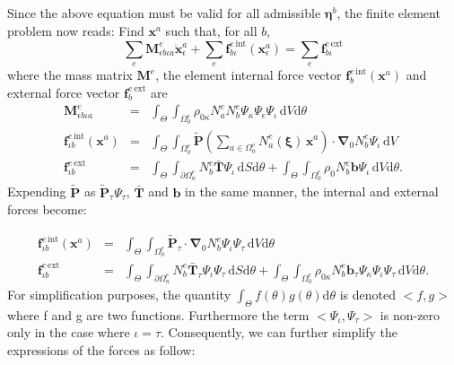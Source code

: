 \documentclass[oneside,11pt,times]{book}
\begin{document}
Since the above equation must be valid for all admissible $\bm{\eta}^b$, the finite element problem now reads: Find $\bm{x}^a$ such that, for all $b$,
%
\begin{equation} \label{equationGlobalWeakForm1}
 \sum_e \bm{M}^{e}_{\epsilon b \iota a} \ddot{\bm{x}}^a_{\epsilon} +
 \sum_e \bm{f}_{b\iota}^{e\,\text{int}}(\bm{x}^a_{\epsilon}) = \sum_e \bm{f}_{b\iota}^{e\,\text{ext}}
\end{equation}
%
where the mass matrix $\bm{M}^{e}$, the element internal force vector $\bm{f}_{b}^{e\,\text{int}}(\bm{x}^a)$ and external force vector $\bm{f}_{b}^{e\,\text{ext}}$ are
%
%
\begin{eqnarray}
 \bm{M}^{e}_{\epsilon b \iota a} & = & \int_{\Theta} \int_{\Omega_{0}^{e}} \rho_{0\kappa} N_a^e N_b^e \Psi_{\kappa}\Psi_{\epsilon}\Psi_{\iota}\, \text{d} V \text{d} \theta    \label{equationElementMassMatrix} \\
 \bm{f}_{\iota b}^{e\,\text{int}}(\bm{x}^a) & = & \int_{\Theta} \int_{\Omega_{0}^e} \tilde{\bm{P}}\left( \sum_{a \in \Omega_{0}^e} N^e_a(\bm{\xi})\, \bm{x}^a \right) \cdot \bm{\nabla}\!_0 N_b^e \Psi_{\iota} \,  \text{d} V \label{equationInternalForceVector} \\
 \bm{f}_{\iota b}^{e\,\text{ext}} & = & \int_{\Theta} \int_{\partial \Omega_{n}^e} N_b^e \bar{\bm{T}} \Psi_{\iota}\, \text{d} S \text{d} \theta +
 \int_{\Theta} \int_{\Omega_{0}^e} \rho_0 N_b^e \bm{b} \Psi_{\iota} \, \text{d} V \text{d} \theta \label{equationExternalForceVector}.
\end{eqnarray}
%
Expending $\tilde{\bm{P}}$ as $\tilde{\bm{P}}_{\tau}\Psi_{\tau}$, $\bar{\bm{T}}$ and $\bm{b}$ in the same manner, the internal and external forces become:

\begin{eqnarray}
 \bm{f}_{\iota b}^{e\,\text{int}}(\bm{x}^a) & = & \int_{\Theta} \int_{\Omega_{0}^e} \tilde{\bm{P}}_{\tau} \cdot \bm{\nabla}\!_0 N_b^e \Psi_{\iota}\Psi_{\tau} \,  \text{d} V \text{d} \theta \label{equationInternalForceVector} \\
 \bm{f}_{\iota b}^{e\,\text{ext}} & = & \int_{\Theta} \int_{\partial \Omega_{n}^e} N_b^e \bar{\bm{T}}_{\tau}  \Psi_{\iota}\Psi_{\tau}\, \text{d} S \text{d} \theta +
 \int_{\Theta} \int_{\Omega_{0}^e} \rho_{0\kappa} N_b^e \bm{b}_{\tau} \Psi_{\kappa}\Psi_{\iota}\Psi_{\tau} \, \text{d} V \text{d} \theta \label{equationExternalForceVector}.
\end{eqnarray}
For simplification purposes, the quantity $\int_{\Theta}f(\theta)g(\theta)\text{d} \theta$ is denoted $<f,g>$ where f and g are two functions. Furthermore the term $<\Psi_{\iota},\Psi_{\tau}>$ is non-zero only in the case where $\iota=\tau$. Consequently, we can further simplify the expressions of the forces as follow:
\end{document}
